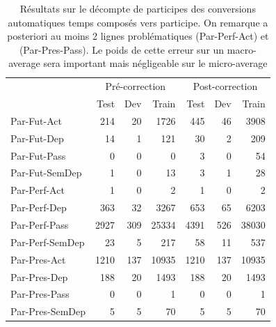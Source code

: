 \begin{table}[h]
\centering
\begin{tabular}{l|rrr|rrr}
\toprule
 & \multicolumn{3}{c}{Pré-correction} & \multicolumn{3}{c}{Post-correction} \\ 
 & Test & Dev & Train & Test & Dev & Train \\ \midrule
Par-Fut-Act & 214 & 20 & 1726 & 445 & 46 & 3908 \\
Par-Fut-Dep & 14 & 1 & 121 & 30 & 2 & 209 \\
Par-Fut-Pass & 0 & 0 & 0 & 3 & 0 & 54 \\
Par-Fut-SemDep & 1 & 0 & 13 & 3 & 1 & 28 \\
Par-Perf-Act & 1 & 0 & 2 & 1 & 0 & 2 \\
Par-Perf-Dep & 363 & 32 & 3267 & 653 & 65 & 6203 \\
Par-Perf-Pass & 2927 & 309 & 25334 & 4391 & 526 & 38030 \\
Par-Perf-SemDep & 23 & 5 & 217 & 58 & 11 & 537 \\
Par-Pres-Act & 1210 & 137 & 10935 & 1210 & 137 & 10935 \\
Par-Pres-Dep & 188 & 20 & 1493 & 188 & 20 & 1493 \\
Par-Pres-Pass & 0 & 0 & 1 & 0 & 0 & 1 \\
Par-Pres-SemDep & 5 & 5 & 70 & 5 & 5 & 70 \\ \bottomrule
\end{tabular}
\caption{Résultats sur le décompte de participes des conversions automatiques temps composés vers participe. On remarque a posteriori au moins 2 lignes problématiques (Par-Perf-Act) et (Par-Pres-Pass). Le poids de cette erreur sur un macro-average sera important mais négligeable sur le micro-average}
\label{table:lasla:correction-temps}
\end{table}

\begin{table}[h]
\centering
{}
\caption{Résultats sur les trois formes principales du participe. En dehors d'un avantage de 2 points sur le rappel des participes présents actifs, tous les autres scores connaissent une augmentation notable, malgré une augmentation nette du nombre de données à tester.}
\label{table:lasla:main-particips}
\end{table}

